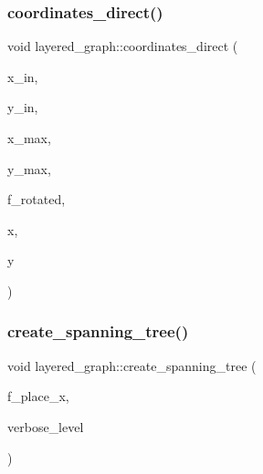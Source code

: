 \subsubsection{\texorpdfstring{coordinates\+\_\+direct()}{coordinates\_direct()}}
{\footnotesize\ttfamily void layered\+\_\+graph\+::coordinates\+\_\+direct (\begin{DoxyParamCaption}\item[{double}]{x\+\_\+in,  }\item[{double}]{y\+\_\+in,  }\item[{\mbox{\hyperlink{galois_8h_a09fddde158a3a20bd2dcadb609de11dc}{I\+NT}}}]{x\+\_\+max,  }\item[{\mbox{\hyperlink{galois_8h_a09fddde158a3a20bd2dcadb609de11dc}{I\+NT}}}]{y\+\_\+max,  }\item[{\mbox{\hyperlink{galois_8h_a09fddde158a3a20bd2dcadb609de11dc}{I\+NT}}}]{f\+\_\+rotated,  }\item[{\mbox{\hyperlink{galois_8h_a09fddde158a3a20bd2dcadb609de11dc}{I\+NT}} \&}]{x,  }\item[{\mbox{\hyperlink{galois_8h_a09fddde158a3a20bd2dcadb609de11dc}{I\+NT}} \&}]{y }\end{DoxyParamCaption})}

\mbox{\label{classlayered__graph_a7993ca913254ae276ff45ab776ed2be9}} 
\subsubsection{\texorpdfstring{create\+\_\+spanning\+\_\+tree()}{create\_spanning\_tree()}}
{\footnotesize\ttfamily void layered\+\_\+graph\+::create\+\_\+spanning\+\_\+tree (\begin{DoxyParamCaption}\item[{\mbox{\hyperlink{galois_8h_a09fddde158a3a20bd2dcadb609de11dc}{I\+NT}}}]{f\+\_\+place\+\_\+x,  }\item[{\mbox{\hyperlink{galois_8h_a09fddde158a3a20bd2dcadb609de11dc}{I\+NT}}}]{verbose\+\_\+level }\end{DoxyParamCaption})}

\mbox{\label{classlayered__graph_a4c76e40c6cf5bfb2ab2df20c33e846bc}} 
